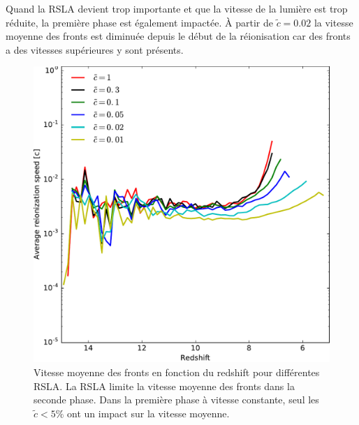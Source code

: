 Quand la \ac{RSLA} devient trop importante et que la vitesse de la lumière est trop réduite, la première phase est également impactée.
À partir de $\tilde{c}=0.02$ la vitesse moyenne des fronts est diminuée depuis le début de la réionisation car des fronts a des vitesses supérieures y sont présents.



\begin{figure}
        \includegraphics[width=.95\linewidth]{img/04_mapreio/avg_reionization_speed.pdf} 
        \caption[Évolution de la vitesse des fronts]{Vitesse moyenne des fronts en fonction du redshift pour différentes \ac{RSLA}.
        La \ac{RSLA} limite la vitesse moyenne des fronts dans la seconde phase.
        Dans la première phase à vitesse constante, seul les $\tilde{c} < 5\% $ ont un impact sur la vitesse moyenne.
        }
 		\label{fig:vreioz_avg}
\end{figure}

